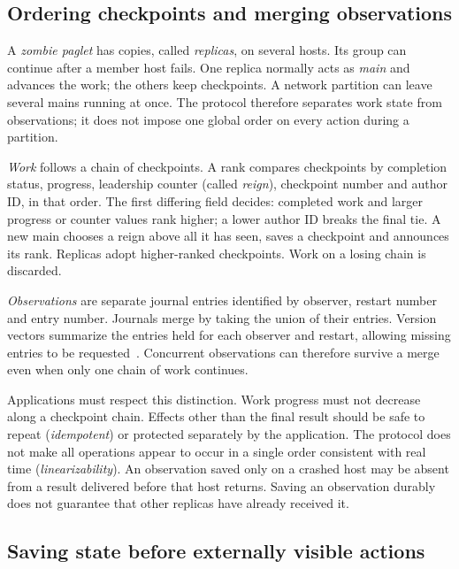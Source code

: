 
\subsection{Ordering checkpoints and merging observations}\label{sec:zombies-design}

A \emph{zombie paglet} has copies, called \emph{replicas}, on several
hosts. Its group can continue after a member host fails. One replica normally acts
as \emph{main} and advances the work; the others keep checkpoints.
A network partition can leave several mains running at once. The protocol
therefore separates work state from observations; it does not impose
one global order on every action during a partition.

\emph{Work} follows a chain of checkpoints. A rank compares checkpoints
by completion status, progress, leadership counter (called \emph{reign}),
checkpoint number and author ID, in that order. The first differing
field decides: completed work and larger progress or counter values
rank higher; a lower author ID breaks the final tie. A new main chooses a reign above
all it has seen, saves a checkpoint and announces its rank. Replicas
adopt higher-ranked checkpoints. Work on a losing chain is discarded.

\emph{Observations} are separate journal entries identified by observer,
restart number and entry number. Journals merge by taking the union of
their entries. Version vectors summarize the entries held for each
observer and restart, allowing missing entries to be
requested~\cite{parker1983versionVectors}. Concurrent observations can
therefore survive a merge even when only one chain of work continues.

Applications must respect this distinction. Work progress must not
decrease along a checkpoint chain. Effects other than the final result
should be safe to repeat (\emph{idempotent}) or protected separately by
the application. The protocol does not make all operations appear to
occur in a single order consistent with real time (\emph{linearizability}).
An observation saved only on a crashed host may be absent from a result
delivered before that host returns. Saving an observation durably does
not guarantee that other replicas have already received it.

\subsection{Saving state before externally visible actions}\label{sec:zombies-durability}

